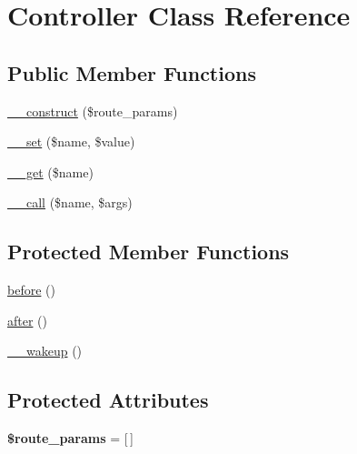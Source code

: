 \hypertarget{class_zest_1_1_component_1_1_controller_1_1_controller}{}\section{Controller Class Reference}
\label{class_zest_1_1_component_1_1_controller_1_1_controller}
\subsection*{Public Member Functions}
\begin{DoxyCompactItemize}
\item 
\mbox{\hyperlink{class_zest_1_1_component_1_1_controller_1_1_controller_a5f46c0a0ad6854eaca9cd182e6075cd3}{\+\_\+\+\_\+construct}} (\$route\+\_\+params)
\item 
\mbox{\hyperlink{class_zest_1_1_component_1_1_controller_1_1_controller_a83c2703c91959192f759992ad5640b67}{\+\_\+\+\_\+set}} (\$name, \$value)
\item 
\mbox{\hyperlink{class_zest_1_1_component_1_1_controller_1_1_controller_abc8e9e31bb15c8a44c3210ec551407c8}{\+\_\+\+\_\+get}} (\$name)
\item 
\mbox{\hyperlink{class_zest_1_1_component_1_1_controller_1_1_controller_af231e86ad32039b9573ae228db5a29fa}{\+\_\+\+\_\+call}} (\$name, \$args)
\end{DoxyCompactItemize}
\subsection*{Protected Member Functions}
\begin{DoxyCompactItemize}
\item 
\mbox{\hyperlink{class_zest_1_1_component_1_1_controller_1_1_controller_acfb47e2bfffbf95c232d7562cfc5b6c1}{before}} ()
\item 
\mbox{\hyperlink{class_zest_1_1_component_1_1_controller_1_1_controller_a1c4f41ef2c0bc555e009e4c937f79f56}{after}} ()
\item 
\mbox{\hyperlink{class_zest_1_1_component_1_1_controller_1_1_controller_a19dd44fe063cfd1cbafe97452e57666c}{\+\_\+\+\_\+wakeup}} ()
\end{DoxyCompactItemize}
\subsection*{Protected Attributes}
\begin{DoxyCompactItemize}
\item 
\mbox{\label{class_zest_1_1_component_1_1_controller_1_1_controller_ab170b7254f65feafb414320c9a8f5cc8}} 
{\bfseries \$route\+\_\+params} = \mbox{[}$\,$\mbox{]}
\end{DoxyCompactItemize}



